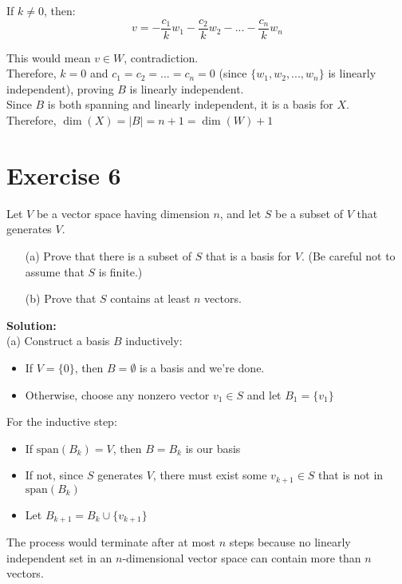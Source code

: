 \documentclass{article}
\begin{document}
If $k \neq 0$, then:
\[v = -\frac{c_1}{k}w_1 - \frac{c_2}{k}w_2 - ... - \frac{c_n}{k}w_n\]

This would mean $v \in W$, contradiction. \\

Therefore, $k = 0$ and $c_1 = c_2 = ... = c_n = 0$ (since $\{w_1, w_2, ..., w_n\}$ is linearly independent), proving $B$ is linearly independent. \\

Since $B$ is both spanning and linearly independent, it is a basis for $X$. \\

Therefore, $\dim(X) = |B| = n + 1 = \dim(W) + 1$

\newpage

\section*{Exercise 6}
Let $V$ be a vector space having dimension $n$, and let $S$ be a subset of $V$ that generates $V$.
\begin{itemize}
\item[(a)] Prove that there is a subset of $S$ that is a basis for $V$. (Be careful not to assume that $S$ is finite.)
\item[(b)] Prove that $S$ contains at least $n$ vectors.
\end{itemize}

\textbf{Solution:} \\

(a) Construct a basis $B$ inductively:
   \begin{itemize}
   \item If $V = \{0\}$, then $B = \emptyset$ is a basis and we're done.
   \item Otherwise, choose any nonzero vector $v_1 \in S$ and let $B_1 = \{v_1\}$
   \end{itemize}

For the inductive step:
   \begin{itemize}
   \item If $\text{span}(B_k) = V$, then $B = B_k$ is our basis
   \item If not, since $S$ generates $V$, there must exist some $v_{k+1} \in S$ that is not in $\text{span}(B_k)$
   \item Let $B_{k+1} = B_k \cup \{v_{k+1}\}$
   \end{itemize}

The process would terminate after at most $n$ steps because no linearly independent set in an $n$-dimensional vector space can contain more than $n$ vectors. \\
\end{document}

